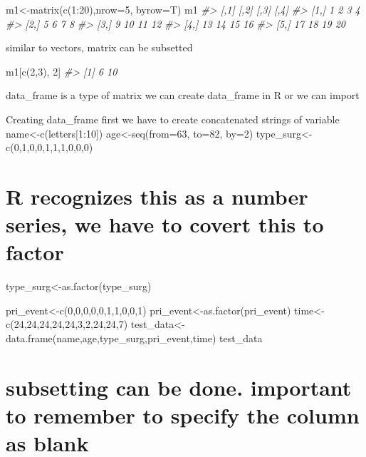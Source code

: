 \documentclass[
]{article}
\newenvironment{Shaded}{\begin{snugshade}}{\end{snugshade}}
\newcommand{\AttributeTok}[1]{\textcolor[rgb]{0.77,0.63,0.00}{#1}}
\newcommand{\CommentTok}[1]{\textcolor[rgb]{0.56,0.35,0.01}{\textit{#1}}}
\newcommand{\DecValTok}[1]{\textcolor[rgb]{0.00,0.00,0.81}{#1}}
\newcommand{\FunctionTok}[1]{\textcolor[rgb]{0.00,0.00,0.00}{#1}}
\newcommand{\NormalTok}[1]{#1}
\newcommand{\OtherTok}[1]{\textcolor[rgb]{0.56,0.35,0.01}{#1}}
\newcommand{\SpecialCharTok}[1]{\textcolor[rgb]{0.00,0.00,0.00}{#1}}
\begin{document}
\begin{Shaded}
\begin{Highlighting}[]
\NormalTok{m1}\OtherTok{\textless{}{-}}\FunctionTok{matrix}\NormalTok{(}\FunctionTok{c}\NormalTok{(}\DecValTok{1}\SpecialCharTok{:}\DecValTok{20}\NormalTok{),}\AttributeTok{nrow=}\DecValTok{5}\NormalTok{, }\AttributeTok{byrow=}\NormalTok{T)}
\NormalTok{m1}
\CommentTok{\#\textgreater{}      [,1] [,2] [,3] [,4]}
\CommentTok{\#\textgreater{} [1,]    1    2    3    4}
\CommentTok{\#\textgreater{} [2,]    5    6    7    8}
\CommentTok{\#\textgreater{} [3,]    9   10   11   12}
\CommentTok{\#\textgreater{} [4,]   13   14   15   16}
\CommentTok{\#\textgreater{} [5,]   17   18   19   20}
\end{Highlighting}
\end{Shaded}

similar to vectors, matrix can be subsetted

\begin{Shaded}
\begin{Highlighting}[]
\NormalTok{m1[}\FunctionTok{c}\NormalTok{(}\DecValTok{2}\NormalTok{,}\DecValTok{3}\NormalTok{), }\DecValTok{2}\NormalTok{]}
\CommentTok{\#\textgreater{} [1]  6 10}
\end{Highlighting}
\end{Shaded}

data\_frame is a type of matrix
we can create data\_frame in R or we can import

Creating data\_frame
first we have to create concatenated strings of variable
name\textless-c(letters{[}1:10{]})
age\textless-seq(from=63, to=82, by=2)
type\_surg\textless- c(0,1,0,0,1,1,1,0,0,0)

\hypertarget{r-recognizes-this-as-a-number-series-we-have-to-covert-this-to-factor}{%
\section{R recognizes this as a number series, we have to covert this to factor}\label{r-recognizes-this-as-a-number-series-we-have-to-covert-this-to-factor}}

type\_surg\textless-as.factor(type\_surg)

pri\_event\textless-c(0,0,0,0,0,1,1,0,0,1)
pri\_event\textless-as.factor(pri\_event)
time\textless-c(24,24,24,24,24,3,2,24,24,7)
test\_data\textless- data.frame(name,age,type\_surg,pri\_event,time)
test\_data

\hypertarget{subsetting-can-be-done.-important-to-remember-to-specify-the-column-as-blank}{%
\section{subsetting can be done. important to remember to specify the column as blank}\label{subsetting-can-be-done.-important-to-remember-to-specify-the-column-as-blank}}
\end{document}
